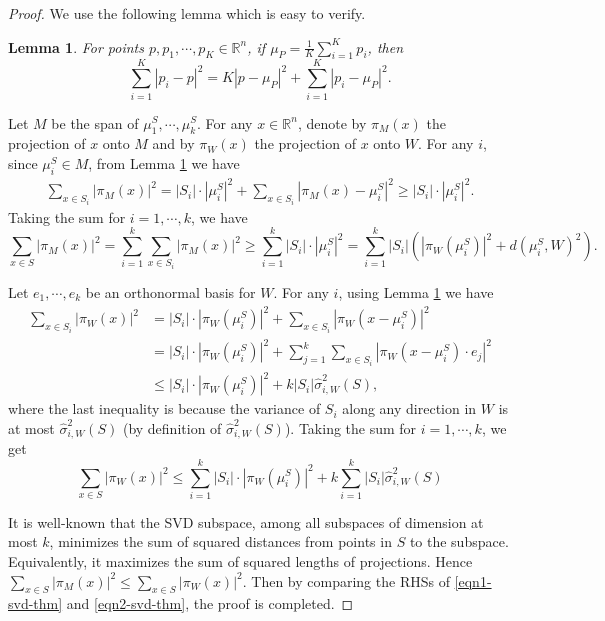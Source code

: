 \documentclass[11pt,letter]{article}
\newtheorem{lemma}{Lemma}
\begin{document}
\begin{proof}
We use the following lemma which is easy to verify.
\begin{lemma}\label{lem:pythagorean}
For points $p, p_1, \cdots, p_K \in \mathbb R^n$, if $\mu_{P} = \frac1K\sum_{i=1}^K p_i$, then
\[
\sum_{i=1}^K |p_i - p|^2 = K|p - \mu_P|^2 + \sum_{i=1}^K |p_i - \mu_P|^2.
\]
\end{lemma}

Let $M$ be the span of $\mu_1^S, \cdots, \mu_k^S$. For any $x\in \mathbb R^n$, denote by $\pi_M(x)$ the projection of $x$ onto $M$ and by $\pi_W(x)$ the projection of $x$ onto $W$. For any $i$, since $\mu_i^S \in M$, from Lemma \ref{lem:pythagorean} we have
\begin{equation*}
\begin{aligned}
\sum_{x\in S_i} |\pi_M(x)|^2 = |S_i|\cdot|\mu_i^S|^2 + \sum_{x\in S_i} |\pi_M(x) - \mu_i^S|^2 
\ge |S_i|\cdot|\mu_i^S|^2.
\end{aligned}
\end{equation*}
Taking the sum for $i=1, \cdots, k$, we have
\begin{equation} \label{eqn1-svd-thm}
\sum_{x\in S}|\pi_M(x)|^2 = \sum_{i=1}^k \sum_{x\in S_i} |\pi_M(x)|^2
\ge \sum_{i=1}^k |S_i|\cdot|\mu_i^S|^2
= \sum_{i=1}^k |S_i| \left( |\pi_W(\mu_i^S)|^2 + d(\mu_i^S, W)^2 \right).
\end{equation}

Let $e_1, \cdots, e_k$ be an orthonormal basis for $W$. For any $i$, using Lemma \ref{lem:pythagorean} we have
\begin{equation*}
\begin{aligned}
\sum_{x\in S_i} |\pi_W(x)|^2 &= |S_i|\cdot|\pi_W(\mu_i^S)|^2 + \sum_{x\in S_i} |\pi_W(x - \mu_i^S)|^2\\
&= |S_i|\cdot|\pi_W(\mu_i^S)|^2 + \sum_{j=1}^k \sum_{x\in S_i} |\pi_W(x - \mu_i^S)\cdot e_j|^2\\
&\le |S_i|\cdot|\pi_W(\mu_i^S)|^2 + k|S_i| \hat \sigma_{i, W}^2(S),
\end{aligned}
\end{equation*}
where the last inequality is because the variance of $S_i$ along any direction in $W$ is at most $\hat \sigma_{i, W}^2(S)$ (by definition of $\hat \sigma_{i, W}^2(S)$). Taking the sum for $i=1,\cdots,k$, we get
\begin{equation} \label{eqn2-svd-thm}
\sum_{x\in S} |\pi_W(x)|^2 \le \sum_{i=1}^k |S_i|\cdot|\pi_W(\mu_i^S)|^2 + k\sum_{i=1}^k |S_i| \hat \sigma_{i, W}^2(S)
\end{equation}

It is well-known that the SVD subspace, among all subspaces of dimension at most $k$, minimizes the sum of squared distances from points in $S$ to the subspace. Equivalently, it maximizes the sum of squared lengths of projections. Hence $\sum_{x\in S}|\pi_M(x)|^2 \le \sum_{x\in S}|\pi_W(x)|^2$. Then by comparing the RHSs of \eqref{eqn1-svd-thm} and \eqref{eqn2-svd-thm}, the proof is completed.
\end{proof}
\end{document}
